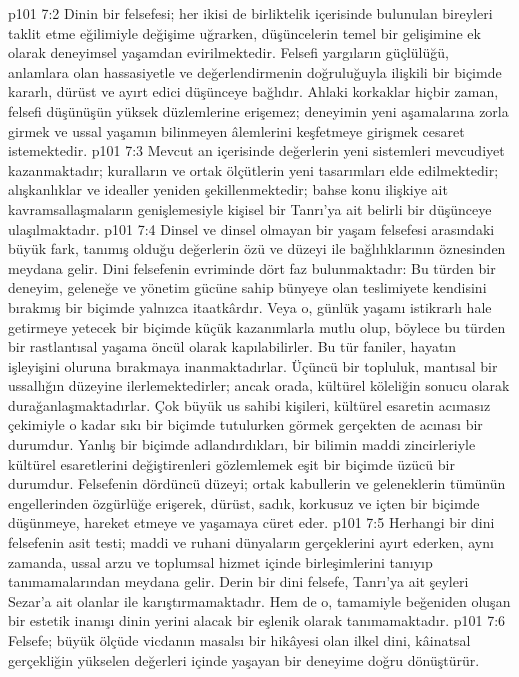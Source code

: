 \vs p101 7:2 Dinin bir felsefesi; her ikisi de birliktelik içerisinde bulunulan bireyleri taklit etme eğilimiyle değişime uğrarken, düşüncelerin temel bir gelişimine ek olarak deneyimsel yaşamdan evirilmektedir. Felsefi yargıların güçlülüğü, anlamlara olan hassasiyetle ve değerlendirmenin doğruluğuyla ilişkili bir biçimde kararlı, dürüst ve ayırt edici düşünceye bağlıdır. Ahlaki korkaklar hiçbir zaman, felsefi düşünüşün yüksek düzlemlerine erişemez; deneyimin yeni aşamalarına zorla girmek ve ussal yaşamın bilinmeyen âlemlerini keşfetmeye girişmek cesaret istemektedir.
\vs p101 7:3 Mevcut an içerisinde değerlerin yeni sistemleri mevcudiyet kazanmaktadır; kuralların ve ortak ölçütlerin yeni tasarımları elde edilmektedir; alışkanlıklar ve idealler yeniden şekillenmektedir; bahse konu ilişkiye ait kavramsallaşmaların genişlemesiyle kişisel bir Tanrı’ya ait belirli bir düşünceye ulaşılmaktadır.
\vs p101 7:4 Dinsel ve dinsel olmayan bir yaşam felsefesi arasındaki büyük fark, tanımış olduğu değerlerin özü ve düzeyi ile bağlılıklarının öznesinden meydana gelir. Dini felsefenin evriminde dört faz bulunmaktadır: Bu türden bir deneyim, geleneğe ve yönetim gücüne sahip bünyeye olan teslimiyete kendisini bırakmış bir biçimde yalnızca itaatkârdır. Veya o, günlük yaşamı istikrarlı hale getirmeye yetecek bir biçimde küçük kazanımlarla mutlu olup, böylece bu türden bir rastlantısal yaşama öncül olarak kapılabilirler. Bu tür faniler, hayatın işleyişini oluruna bırakmaya inanmaktadırlar. Üçüncü bir topluluk, mantısal bir ussallığın düzeyine ilerlemektedirler; ancak orada, kültürel köleliğin sonucu olarak durağanlaşmaktadırlar. Çok büyük us sahibi kişileri, kültürel esaretin acımasız çekimiyle o kadar sıkı bir biçimde tutulurken görmek gerçekten de acınası bir durumdur. Yanlış bir biçimde adlandırdıkları, bir bilimin maddi zincirleriyle kültürel esaretlerini değiştirenleri gözlemlemek eşit bir biçimde üzücü bir durumdur. Felsefenin dördüncü düzeyi; ortak kabullerin ve geleneklerin tümünün engellerinden özgürlüğe erişerek, dürüst, sadık, korkusuz ve içten bir biçimde düşünmeye, hareket etmeye ve yaşamaya cüret eder.
\vs p101 7:5 Herhangi bir dini felsefenin asit testi; maddi ve ruhani dünyaların gerçeklerini ayırt ederken, aynı zamanda, ussal arzu ve toplumsal hizmet içinde birleşimlerini tanıyıp tanımamalarından meydana gelir. Derin bir dini felsefe, Tanrı’ya ait şeyleri Sezar’a ait olanlar ile karıştırmamaktadır. Hem de o, tamamiyle beğeniden oluşan bir estetik inanışı dinin yerini alacak bir eşlenik olarak tanımamaktadır.
\vs p101 7:6 Felsefe; büyük ölçüde vicdanın masalsı bir hikâyesi olan ilkel dini, kâinatsal gerçekliğin yükselen değerleri içinde yaşayan bir deneyime doğru dönüştürür.
